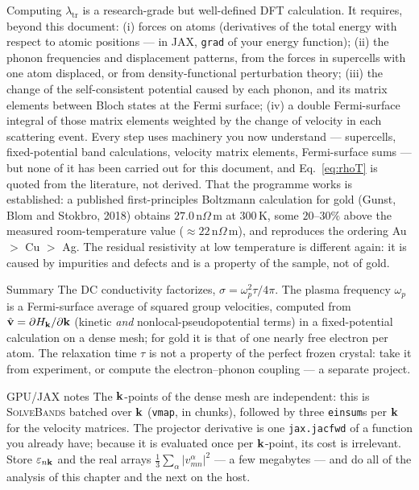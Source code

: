 Computing $\lambda_{\mathrm{tr}}$ is a research-grade but well-defined DFT
calculation. It requires, beyond this document: (i) forces on atoms
(derivatives of the total energy with respect to atomic positions --- in
JAX, \texttt{grad} of your energy function); (ii) the phonon frequencies
and displacement patterns, from the forces in supercells with one atom
displaced, or from density-functional perturbation theory; (iii) the
change of the self-consistent potential caused by each phonon, and its
matrix elements between Bloch states at the Fermi surface; (iv) a double
Fermi-surface integral of those matrix elements weighted by the change of
velocity in each scattering event. Every step uses machinery you now
understand --- supercells, fixed-potential band calculations, velocity
matrix elements, Fermi-surface sums --- but none of it has been carried
out for this document, and Eq.~\eqref{eq:rhoT} is quoted from the
literature, not derived. That the programme works is established: a
published first-principles Boltzmann calculation for gold (Gunst, Blom
and Stokbro, 2018) obtains $27.0$\,n$\Omega$\,m at 300\,K, some $20$--$30\%$ above the
measured room-temperature value ($\approx 22$\,n$\Omega$\,m), and reproduces the ordering Au $>$ Cu $>$ Ag. The residual resistivity at low temperature is different again:
it is caused by impurities and defects and is a property of the sample,
not of gold.

\begin{keybox}{Summary}
The DC conductivity factorizes, $\sigma = \omega_p^2\tau/4\pi$. The plasma
frequency $\omega_p$ is a Fermi-surface average of squared group
velocities, computed from $\hat{\mathbf v} = \partial H_{\mathbf{k}}/\partial\mathbf{k}$
(kinetic \emph{and} nonlocal-pseudopotential terms) in a fixed-potential
calculation on a dense mesh; for gold it is that of one nearly free
electron per atom. The relaxation time $\tau$ is not a property of the
perfect frozen crystal: take it from experiment, or compute the
electron--phonon coupling --- a separate project.
\end{keybox}

\begin{gpubox}{GPU/JAX notes}
The $\mathbf{k}$-points of the dense mesh are independent: this is
\textsc{SolveBands} batched over $\mathbf{k}$ (\texttt{vmap}, in chunks), followed
by three \texttt{einsum}s per $\mathbf{k}$ for the velocity matrices. The
projector derivative is one \texttt{jax.jacfwd} of a function you already
have; because it is evaluated once per $\mathbf{k}$-point, its cost is
irrelevant. Store $\varepsilon_{n\mathbf{k}}$ and the real arrays
$\tfrac13\sum_\alpha|v^\alpha_{mn}|^2$ --- a few megabytes --- and do all
of the analysis of this chapter and the next on the host.
\end{gpubox}
